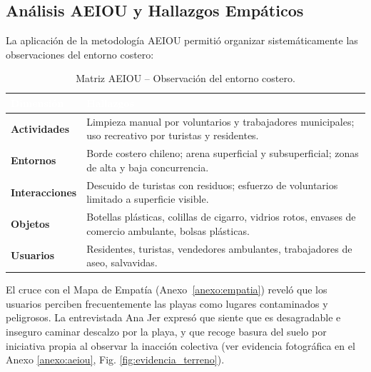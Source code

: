 \documentclass[12pt, letterpaper]{article}
\begin{document}
\subsection{Análisis AEIOU y Hallazgos Empáticos}

La aplicación de la metodología AEIOU permitió organizar sistemáticamente las
observaciones del entorno costero:

\begin{table}[H]
	\centering
	\caption{Matriz AEIOU -- Observación del entorno costero.}
	\label{tab:aeiou}
	\renewcommand{\arraystretch}{1.4}
	\begin{tabular}{|p{2.8cm}|p{10.5cm}|}
		\hline
		\rowcolor[HTML]{4F81BD}\textcolor{white}{\textbf{Dimensión}} & \textcolor{white}{\textbf{Hallazgos}}                                                                    \\ \hline
		\textbf{Actividades}                                         & Limpieza manual por voluntarios y trabajadores municipales; uso recreativo por turistas y residentes.    \\ \hline
		\textbf{Entornos}                                            & Borde costero chileno; arena superficial y subsuperficial; zonas de alta y baja concurrencia.            \\ \hline
		\textbf{Interacciones}                                       & Descuido de turistas con residuos; esfuerzo de voluntarios limitado a superficie visible.                \\ \hline
		\textbf{Objetos}                                             & Botellas plásticas, colillas de cigarro, vidrios rotos, envases de comercio ambulante, bolsas plásticas. \\ \hline
		\textbf{Usuarios}                                            & Residentes, turistas, vendedores ambulantes, trabajadores de aseo, salvavidas.                           \\ \hline
	\end{tabular}
\end{table}

El cruce con el Mapa de Empatía (Anexo~\ref{anexo:empatia}) reveló que los usuarios
perciben frecuentemente las playas como lugares contaminados y peligrosos.
La entrevistada Ana Jer expresó que siente que es desagradable e inseguro caminar
descalzo por la playa, y que recoge basura del suelo por iniciativa propia al observar
la inacción colectiva (ver evidencia fotográfica en el Anexo \ref{anexo:aeiou}, Fig. \ref{fig:evidencia_terreno}).
\end{document}
